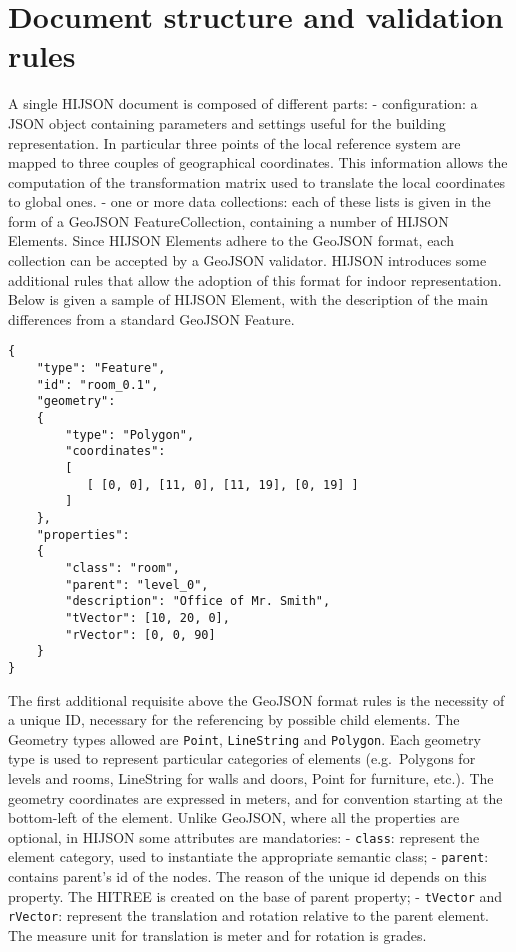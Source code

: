 \documentclass[]{article}
\begin{document}
\section{Document structure and validation
rules}\label{document-structure-and-validation-rules}

A single HIJSON document is composed of different parts: -
configuration: a JSON object containing parameters and settings useful
for the building representation. In particular three points of the local
reference system are mapped to three couples of geographical
coordinates. This information allows the computation of the
transformation matrix used to translate the local coordinates to global
ones. - one or more data collections: each of these lists is given in
the form of a GeoJSON FeatureCollection, containing a number of HIJSON
Elements. Since HIJSON Elements adhere to the GeoJSON format, each
collection can be accepted by a GeoJSON validator. HIJSON introduces
some additional rules that allow the adoption of this format for indoor
representation. Below is given a sample of HIJSON Element, with the
description of the main differences from a standard GeoJSON Feature.

\begin{verbatim}
{
    "type": "Feature",
    "id": "room_0.1",
    "geometry": 
    {
        "type": "Polygon",
        "coordinates": 
        [ 
           [ [0, 0], [11, 0], [11, 19], [0, 19] ]
        ]    
    },
    "properties": 
    {
        "class": "room",
        "parent": "level_0",
        "description": "Office of Mr. Smith",
        "tVector": [10, 20, 0],
        "rVector": [0, 0, 90]
    }
}
\end{verbatim}

The first additional requisite above the GeoJSON format rules is the
necessity of a unique ID, necessary for the referencing by possible
child elements. The Geometry types allowed are \texttt{Point},
\texttt{LineString} and \texttt{Polygon}. Each geometry type is used to
represent particular categories of elements (e.g.~Polygons for levels
and rooms, LineString for walls and doors, Point for furniture, etc.).
The geometry coordinates are expressed in meters, and for convention
starting at the bottom-left of the element. Unlike GeoJSON, where all
the properties are optional, in HIJSON some attributes are mandatories:
- \texttt{class}: represent the element category, used to instantiate
the appropriate semantic class; - \texttt{parent}: contains parent's id
of the nodes. The reason of the unique id depends on this property. The
HITREE is created on the base of parent property; - \texttt{tVector} and
\texttt{rVector}: represent the translation and rotation relative to the
parent element. The measure unit for translation is meter and for
rotation is grades.
\end{document}
